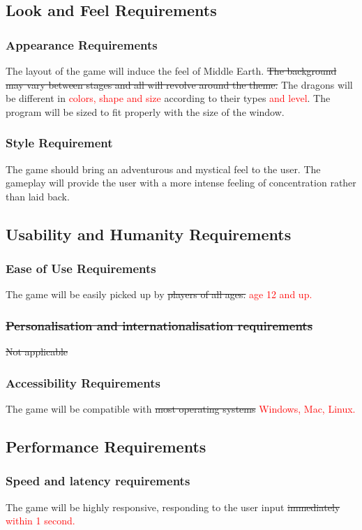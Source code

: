 \documentclass{article}
\begin{document}
\subsection{Look and Feel Requirements}
\subsubsection{Appearance Requirements}
The layout of the game will induce the feel of Middle Earth. \st{The background may vary between stages and all will revolve around the theme.} The dragons will be different in  \textcolor{red}{colors, shape and size} according to their types \textcolor{red}{and level}. The program will be sized to fit properly with the size of the window.
\subsubsection{Style Requirement}
The game should bring an adventurous and mystical feel to the user. The gameplay will provide the user with a more intense feeling of concentration rather than laid back.

\subsection{Usability and Humanity Requirements}
\subsubsection{Ease of Use Requirements}
The game will be easily picked up by \st{players of all ages.} \textcolor{red}{age 12 and up.}
\subsubsection{\sout{Personalisation and internationalisation requirements}}
\st{Not applicable}
\subsubsection{Accessibility Requirements}
The game will be compatible with \st{most operating systems} \textcolor{red}{Windows, Mac, Linux.}

\subsection{Performance Requirements}
\subsubsection{Speed and latency requirements}
The game will be highly responsive, responding to the user input \st{immediately} \textcolor{red}{within 1 second.}
\end{document}
